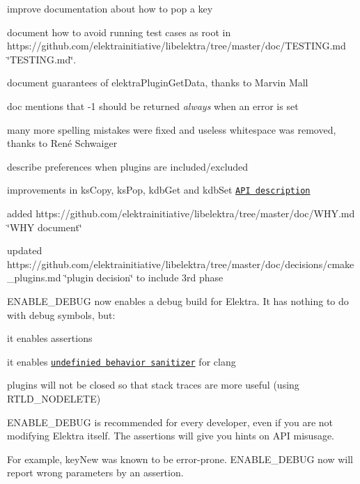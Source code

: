 \begin{DoxyItemize}
\item improve documentation about how to pop a key
\item document how to avoid running test cases as root in https\+://github.com/elektrainitiative/libelektra/tree/master/doc/\+T\+E\+S\+T\+I\+N\+G.\+md \char`\"{}\+T\+E\+S\+T\+I\+N\+G.\+md\char`\"{}.
\item document guarantees of {\ttfamily elektra\+Plugin\+Get\+Data}, thanks to Marvin Mall
\item doc mentions that -\/1 should be returned {\itshape always} when an error is set
\item many more spelling mistakes were fixed and useless whitespace was removed, thanks to René Schwaiger
\item describe preferences when plugins are included/excluded
\item improvements in {\ttfamily ks\+Copy}, {\ttfamily ks\+Pop}, {\ttfamily kdb\+Get} and {\ttfamily kdb\+Set} \href{https://doc.libelektra.org/api/0.8.17/html/}{\tt A\+PI description}
\item added https\+://github.com/elektrainitiative/libelektra/tree/master/doc/\+W\+H\+Y.\+md \char`\"{}\+W\+H\+Y document\char`\"{}
\item updated https\+://github.com/elektrainitiative/libelektra/tree/master/doc/decisions/cmake\+\_\+plugins.\+md \char`\"{}plugin decision\char`\"{} to include 3rd phase
\end{DoxyItemize}

E\+N\+A\+B\+L\+E\+\_\+\+D\+E\+B\+UG now enables a debug build for Elektra. It has nothing to do with debug symbols, but\+:


\begin{DoxyItemize}
\item it enables assertions
\item it enables \href{http://clang.llvm.org/docs/UndefinedBehaviorSanitizer.html}{\tt undefinied behavior sanitizer} for clang
\item plugins will not be closed so that stack traces are more useful (using {\ttfamily R\+T\+L\+D\+\_\+\+N\+O\+D\+E\+L\+E\+TE})
\end{DoxyItemize}

{\ttfamily E\+N\+A\+B\+L\+E\+\_\+\+D\+E\+B\+UG} is recommended for every developer, even if you are not modifying Elektra itself. The assertions will give you hints on A\+PI misusage.

For example, {\ttfamily key\+New} was known to be error-\/prone. {\ttfamily E\+N\+A\+B\+L\+E\+\_\+\+D\+E\+B\+UG} now will report wrong parameters by an assertion.

